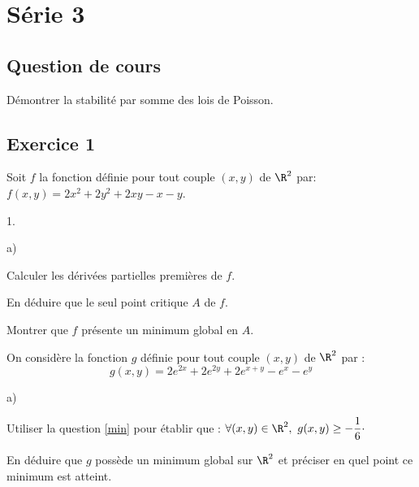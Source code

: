 \documentclass[11pt]{article}%
\begin{document}
\newpage
 
\section*{Série 3}
\subsection*{Question de cours}
\noindent
Démontrer la stabilité par somme des lois de Poisson.

\subsection*{Exercice 1}
\noindent
Soit $f$ la fonction définie pour tout couple $(x,y)$ de $\R^{2}$
par: $f(x,y) = 2 x^{2} +2 y^{2}+ 2xy - x - y$.
\begin{noliste}{1.}
\item
\begin{noliste}{a)}
\item 
Calculer les dérivées partielles premières de $f$.
\item  
En déduire que le seul point critique $A$ de $f$.%
\end{noliste}
\item\label{min}
Montrer que $f$ présente un minimum global en $A$.
\item 
On considère la fonction $g$ définie pour tout couple $(x,y)$ de 
$\R^{2}$ par :
\[
 g(x,y) = 2 e^{2x} + 2 e^{2y} + 2 e^{x+y} - e^{x}- e^{y}
\]
\begin{noliste}{a)}
\item 
Utiliser la question \ref{min} pour établir que : \quad $\forall(x,y)\in 
\R^{2},\ g(x,y) \ge -\dfrac{1}{6}\cdotp$
\item 
En déduire que $g$ possède un minimum global sur $\R^{2}$ et préciser en 
quel point ce minimum est atteint.
\end{noliste}
\end{noliste}
\end{document}
